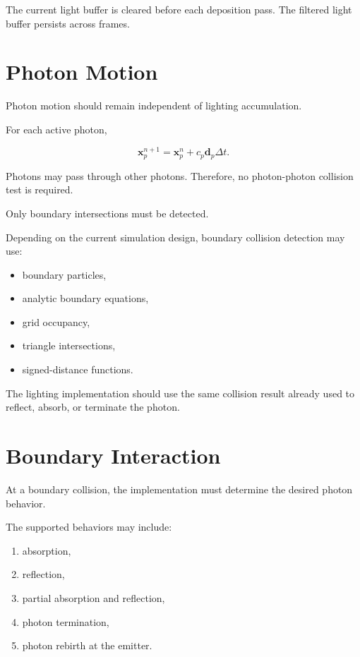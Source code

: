 \documentclass[11pt]{article}
\begin{document}
The current light buffer is cleared before each deposition pass. The filtered
light buffer persists across frames.

\section{Photon Motion}

Photon motion should remain independent of lighting accumulation.

For each active photon,

\begin{equation}
    \mathbf{x}_{p}^{n+1}
    =
    \mathbf{x}_{p}^{n}
    +
    c_{p}\mathbf{d}_{p}\Delta t.
\end{equation}

Photons may pass through other photons. Therefore, no photon-photon collision
test is required.

Only boundary intersections must be detected.

Depending on the current simulation design, boundary collision detection may
use:

\begin{itemize}
    \item boundary particles,
    \item analytic boundary equations,
    \item grid occupancy,
    \item triangle intersections,
    \item signed-distance functions.
\end{itemize}

The lighting implementation should use the same collision result already used
to reflect, absorb, or terminate the photon.

\section{Boundary Interaction}

At a boundary collision, the implementation must determine the desired photon
behavior.

The supported behaviors may include:

\begin{enumerate}
    \item absorption,
    \item reflection,
    \item partial absorption and reflection,
    \item photon termination,
    \item photon rebirth at the emitter.
\end{enumerate}
\end{document}
